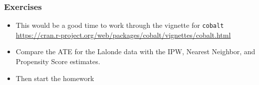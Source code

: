 \documentclass[xcolor=pdftex,dvipsnames,table,mathserif,aspectratio=169]{beamer}
\begin{document}
\begin{frame}
\frametitle{Exercises}
\begin{itemize}
\item This would be a good time to work through the vignette for \texttt{cobalt}
 \url{https://cran.r-project.org/web/packages/cobalt/vignettes/cobalt.html}
 \item Compare the ATE for the Lalonde data with the IPW, Nearest Neighbor, and Propensity Score estimates.
 \item Then start the homework
\end{itemize}
\end{frame}
\end{document}
